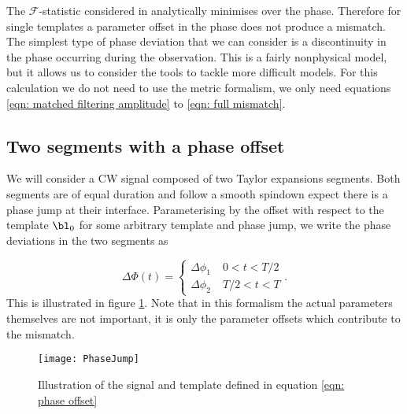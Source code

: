 The $\mathcal{F}$-statistic considered in \citet{Brady1998} analytically 
minimises over the phase. Therefore for single
templates a parameter offset in the phase
does not produce a mismatch. The simplest type of phase deviation that we can
consider is a discontinuity in the phase occurring during the observation. This 
is a fairly nonphysical model, but it allows us to consider the tools to 
tackle more difficult models. For this calculation we do not need to use the
metric formalism, we only need equations \eqref{eqn: matched filtering amplitude}
to \eqref{eqn: full mismatch}.

\subsection{Two segments with a phase offset}
\label{sec: Two segments with a phase offset}

We will consider a CW signal composed of two Taylor expansions segments.  Both
segments are of equal duration and follow a smooth spindown expect there is a
phase jump at their interface. Parameterising by the offset with respect to
the template $\bl_{0}$ for some arbitrary template and phase jump, we write the
phase deviations in the two segments as

\begin{equation}
 \Delta\Phi(t) = \left\{
\begin{array}{cr}
\Delta \phi_{1}& \; 0 < t < T/2 \\
\Delta \phi_{2} & \;  T/2 < t < T 
\end{array}.
\right.
\label{eqn: phase offset}
\end{equation}
This is illustrated in figure \ref{fig: PhaseJump}. Note that in this formalism
the actual parameters themselves are not important, it is only the parameter
offsets which contribute to the mismatch.
\begin{figure}[htb]
    \centering
    \texttt{[image: PhaseJump]}
    \caption{Illustration of the signal and template defined in equation 
        \eqref{eqn: phase offset}}
    \label{fig: PhaseJump}
\end{figure}

